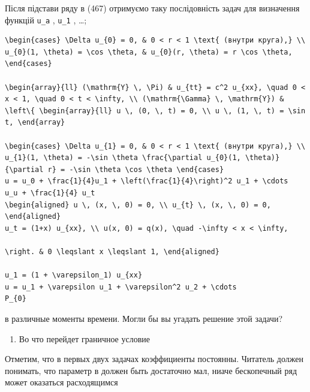 \documentclass[
  ukrainian,
]{article}
\providecommand{\tightlist}{%
  \setlength{\itemsep}{0pt}\setlength{\parskip}{0pt}}
\begin{document}
Після підстави ряду в (467) отримуємо таку послідовність задач для
визначення функцій \texttt{u\_a} , \texttt{u\_1} , \ldots;

\begin{verbatim}
\begin{cases} \Delta u_{0} = 0, & 0 < r < 1 \text{ (внутри круга),} \\ u_{0}(1, \theta) = \cos \theta, & u_{0}(r, \theta) = r \cos \theta, \end{cases}

\begin{array}{ll} (\mathrm{Y} \, \Pi) & u_{tt} = c^2 u_{xx}, \quad 0 < x < 1, \quad 0 < t < \infty, \\ (\mathrm{\Gamma} \, \mathrm{Y}) & \left\{ \begin{array}{ll} u \, (0, \, t) = 0, \\ u \, (1, \, t) = \sin t, \end{array}

\begin{cases} \Delta u_{1} = 0, & 0 < r < 1 \text{ (внутри круга),} \\ u_{1}(1, \theta) = -\sin \theta \frac{\partial u_{0}(1, \theta)}{\partial r} = -\sin \theta \cos \theta \end{cases}
u = u_0 + \frac{1}{4}u_1 + \left(\frac{1}{4}\right)^2 u_1 + \cdots
u_u + \frac{1}{4} u_t
\begin{aligned} u \, (x, \, 0) = 0, \\ u_{t} \, (x, \, 0) = 0, \end{aligned}
u_t = (1+x) u_{xx}, \\ u(x, 0) = q(x), \quad -\infty < x < \infty,

\right. & 0 \leqslant x \leqslant 1, \end{aligned}

u_1 = (1 + \varepsilon_1) u_{xx}
u = u_1 + \varepsilon u_1 + \varepsilon^2 u_2 + \cdots
P_{0}
\end{verbatim}

в различные моменты времени. Могли бы вы угадать решение этой задачи?

\begin{enumerate}
\def\labelenumi{\arabic{enumi}.}
\setcounter{enumi}{2}
\tightlist
\item
  Во что перейдет граничное условие
\end{enumerate}

Отметим, что в первых двух задачах коэффициенты постоянны. Читатель
должен понимать, что параметр в должен быть достаточно мал, ниаче
бескопечный ряд может оказаться расходящимся
\end{document}
